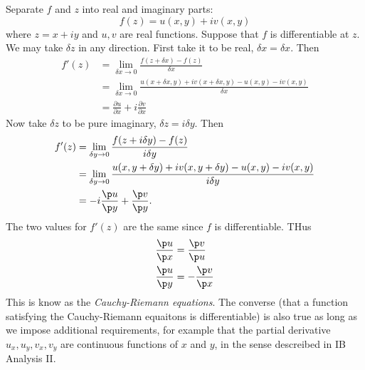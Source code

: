 \documentclass[a4paper]{article}
\begin{document}
Separate \(f\) and \(z\) into real and imaginary parts:
\[
  f(z) = u(x, y) + iv(x, y)
\]
where \(z = x + iy\) and \(u, v\) are real functions. Suppose that \(f\) is differentiable at \(z\). We may take \(\delta z\) in any direction. First take it to be real, \(\delta x = \delta x\). Then
\begin{align*}
  f'(z) &= \lim_{\delta x \to 0} \frac{f(z + \delta x) - f(z)}{\delta x} \\
        &= \lim_{\delta x \to 0} \frac{u(x + \delta x, y) + iv(x + \delta x, y) - u(x, y) - iv(x, y)}{\delta x} \\
        &= \frac{\partial u}{\partial x} + i \frac{\partial v}{\partial x}
\end{align*}
Now take \(\delta z\) to be pure imaginary, \(\delta z = i\delta y\). Then
\begin{align*}
  f'(z) &= \lim_{\delta y \to 0} \frac{f(z + i\delta y) - f(z)}{i\delta y} \\
        &= \lim_{\delta y \to 0} \frac{u(x, y + \delta y) + iv(x, y + \delta y) - u(x, y) - iv(x, y)}{i\delta y} \\
        &= -i\frac{\p u}{\p y} + \frac{\p v}{\p y}.
\end{align*}
The two values for \(f'(z)\) are the same since \(f\) is differentiable. THus
\begin{align*}
  \frac{\p u}{\p x} &= \frac{\p v}{\p u} \\
  \frac{\p u}{\p y} &= -\frac{\p v}{\p x}
\end{align*}
This is know as the \emph{Cauchy-Riemann equations}. The converse (that a function satisfying the Cauchy-Riemann equaitons is differentiable) is also true as long as we impose additional requirements, for example that the partial derivative \(u_x, u_y, v_x, v_y\) are continuous functions of \(x\) and \(y\), in the sense descreibed in IB Analysis II.
\end{document}
